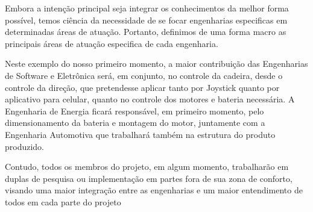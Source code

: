 Embora a intenção principal seja integrar os conhecimentos da melhor forma possível, temos ciência da necessidade de se focar engenharias especificas em determinadas áreas de atuação. Portanto, definimos de uma forma macro as principais áreas de atuação especifica de cada engenharia.

Neste exemplo do nosso primeiro momento, a maior contribuição das Engenharias de Software e Eletrônica será, em conjunto, no controle da cadeira, desde o controle da direção, que pretendesse aplicar tanto por Joystick quanto por aplicativo para celular, quanto no controle dos motores e bateria necessária. A Engenharia de Energia ficará responsável, em primeiro momento, pelo dimensionamento da bateria e montagem do motor, juntamente com a Engenharia Automotiva que trabalhará também na estrutura do produto produzido.

Contudo, todos os membros do projeto, em algum momento, trabalharão em duplas de pesquisa ou implementação em partes fora de sua zona de conforto, visando uma maior integração entre as engenharias e um maior entendimento de todos em cada parte do projeto
